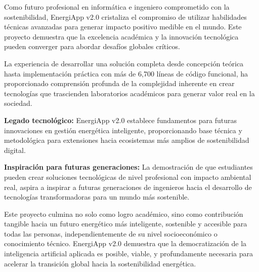 Como futuro profesional en informática e ingeniero comprometido con la sostenibilidad, EnergiApp v2.0 cristaliza el compromiso de utilizar habilidades técnicas avanzadas para generar impacto positivo medible en el mundo. Este proyecto demuestra que la excelencia académica y la innovación tecnológica pueden converger para abordar desafíos globales críticos.

La experiencia de desarrollar una solución completa desde concepción teórica hasta implementación práctica con más de 6,700 líneas de código funcional, ha proporcionado comprensión profunda de la complejidad inherente en crear tecnologías que trascienden laboratorios académicos para generar valor real en la sociedad.

\textbf{Legado tecnológico:} EnergiApp v2.0 establece fundamentos para futuras innovaciones en gestión energética inteligente, proporcionando base técnica y metodológica para extensiones hacia ecosistemas más amplios de sostenibilidad digital.

\textbf{Inspiración para futuras generaciones:} La demostración de que estudiantes pueden crear soluciones tecnológicas de nivel profesional con impacto ambiental real, aspira a inspirar a futuras generaciones de ingenieros hacia el desarrollo de tecnologías transformadoras para un mundo más sostenible.

Este proyecto culmina no solo como logro académico, sino como contribución tangible hacia un futuro energético más inteligente, sostenible y accesible para todas las personas, independientemente de su nivel socioeconómico o conocimiento técnico. EnergiApp v2.0 demuestra que la democratización de la inteligencia artificial aplicada es posible, viable, y profundamente necesaria para acelerar la transición global hacia la sostenibilidad energética.
